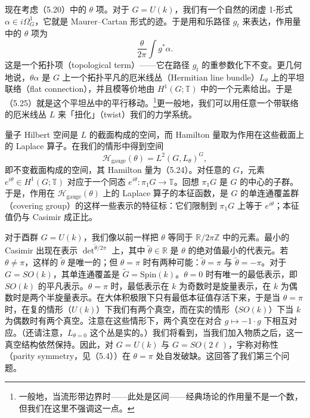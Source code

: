 
现在考虑（5.20）中的 $\theta$ 项。对于 $G=U(k)$，我们有一个自然的闭虚 1-形式 $\alpha\in i\Omega^1_G$，它就是 Maurer–Cartan 形式的迹。于是用和乐路径 $g_t$ 来表达，作用量中的 $\theta$ 项为
\begin{equation}
  \tag{5.25}
  \label{eq:5-25}
  \frac{\theta}{2\pi}\int g^{*}\alpha.
\end{equation}
这是一个拓扑项（topological term）——它在路径 $g_t$ 的重参数化下不变。更几何地说，$\theta\alpha$ 是 $G$ 上一个拓扑平凡的厄米线丛（Hermitian line bundle）$L_\theta$ 上的平坦联络（flat connection），并且模等价地由 $H^1(G;\mathbb{T})$ 中的一个元素给出。于是（5.25）就是这个平坦丛中的平行移动。\footnote{一般地，当流形带边界时——此处是区间——经典场论的作用量不是一个数，但我们在这里不强调这一点。}更一般地，我们可以用任意一个带联络的厄米线丛 $L$ 来「扭化」（twist）我们的力学系统。

量子 Hilbert 空间是 $L$ 的截面构成的空间，而 Hamilton 量取为作用在这些截面上的 Laplace 算子。在我们的情形中得到空间
\[
  \mathcal{H}_{\mathrm{gauge}}(\theta)=L^2(G,L_\theta)^G,
\]
即不变截面构成的空间，其 Hamilton 量为（5.24）。对任意的 $G$，元素 $e^{i\theta}\in H^1(G;\mathbb{T})$ 对应于一个同态 $e^{i\theta}:\pi_1G\to\mathbb{T}$。回想 $\pi_1G$ 是 $G$ 的中心的子群。于是，作用在 $\mathcal{H}_{\mathrm{gauge}}(\theta)$ 上的 Laplace 算子的本征函数，是 $G$ 的单连通覆盖群（covering group）的这样一些表示的特征标：它们限制到 $\pi_1G$ 上等于 $e^{i\theta}$；本征值仍与 Casimir 成正比。

对于酉群 $G=U(k)$，我们像以前一样把 $\theta$ 等同于 $\mathbb{R}/2\pi\mathbb{Z}$ 中的元素。最小的 Casimir 出现在表示 $\det^{\tilde\theta/2\pi}$ 上，其中 $\tilde\theta\in\mathbb{R}$ 是 $\theta$ 的绝对值最小的代表元。若 $\theta\neq\pi$，这样的 $\tilde\theta$ 是唯一的；但 $\theta=\pi$ 时有两种可能：$\tilde\theta=\pi$ 与 $\tilde\theta=-\pi$。对于 $G=SO(k)$，其单连通覆盖是 $\tilde G=\mathrm{Spin}(k)$。$\theta=0$ 时有唯一的最低表示，即 $SO(k)$ 的平凡表示。$\theta=\pi$ 时，最低表示在 $k$ 为奇数时是旋量表示，在 $k$ 为偶数时是两个半旋量表示。在大体积极限下只有最低本征值存活下来，于是当 $\theta=\pi$ 时，在复的情形（$U(k)$）下我们有两个真空，而在实的情形（$SO(k)$）下当 $k$ 为偶数时有两个真空。注意在这些情形下，两个真空在对合 $g\mapsto-1\cdot g$ 下相互对应。（还请注意，$L_{\theta=0}$ 这个丛是实的。）我们将看到，当我们加入物质之后，这一真空结构依然保持。因此，对 $G=U(k)$ 与 $G=SO(2\ell)$，宇称对称性（parity symmetry，见（5.4））在 $\theta=\pi$ 处自发破缺。这回答了我们第三个问题。

